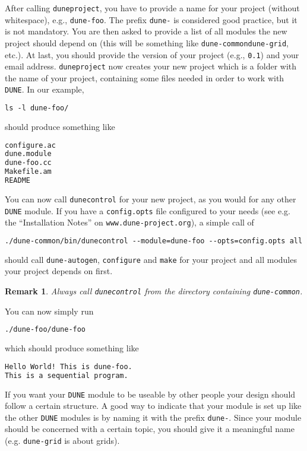\documentclass[11pt,a4paper,headinclude,footinclude,DIV16,normalheadings]{scrartcl}
\newtheorem{remark}{Remark}[section]
\newcommand{\dune}{\texttt{DUNE}\xspace}
\newcommand{\autogen}{\texttt{dune-autogen}\xspace}
\newcommand{\configure}{\texttt{configure}\xspace}
\newcommand{\dunecommon}{\texttt{dune-common}\xspace}
\newcommand{\dunegrid}{\texttt{dune-grid}\xspace}
\newcommand{\dunecontrol}{\texttt{dunecontrol}\xspace}
\newcommand{\duneproject}{\texttt{duneproject}\xspace}
\newcommand{\make}{\texttt{make}\xspace}
\begin{document}
After calling \duneproject, you have to provide a name for your project
(without whitespace), e.g., \texttt{dune-foo}. 
The prefix \texttt{dune-} is considered good practice, but it is not
mandatory.
You are then asked to provide a
list of all modules the new project should depend on (this will be
something like \dunecommon \dunegrid, etc.). At last, you should provide
the version of your project (e.g., \texttt{0.1}) and your email address.
\duneproject now creates your new project which is a folder with the name of your project,
containing some files needed in order to work with \dune.
In our example,
 
\begin{lstlisting}[language=make]
ls -l dune-foo/
\end{lstlisting}
should produce something like

\begin{lstlisting}[language=make]
configure.ac
dune.module
dune-foo.cc
Makefile.am
README
\end{lstlisting}

You can now call \dunecontrol for your new project, as you would for any other \dune module. If you have a \texttt{config.opts}\xspace
file configured to your needs (see e.g. the ``Installation Notes'' on
\texttt{www.dune-project.org}), a simple call of

\begin{lstlisting}[language=make]
./dune-common/bin/dunecontrol --module=dune-foo --opts=config.opts all
\end{lstlisting}
should call \autogen, \configure and \make for your
project and all modules your project depends on first.

\begin{remark}
Always call \dunecontrol from the directory containing \dunecommon.
\end{remark}

You can now  simply run

\begin{lstlisting}[language=make]
./dune-foo/dune-foo
\end{lstlisting}
which should produce something like

\begin{lstlisting}[language=make]
Hello World! This is dune-foo.
This is a sequential program.
\end{lstlisting}

If you want your \dune module to be useable by other people your design should
follow a certain structure. A good way to indicate that your module is set up
like the other \dune modules is by naming it with the prefix
\texttt{dune-}\xspace. 
Since your module should be concerned with a certain topic, you should give it
a meaningful name (e.g. \dunegrid is about grids). 
\end{document}
